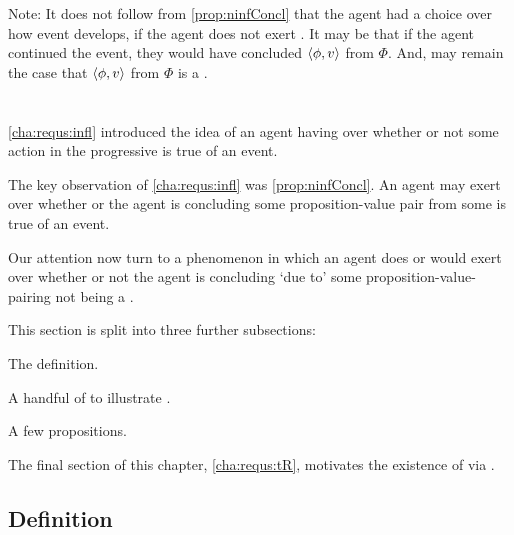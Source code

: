 \begin{note}
  Note:
  It does not follow from \autoref{prop:ninfConcl} that the agent had a choice over how event develops, if the agent does not exert \ninf{}.
  It may be that if the agent continued the event, they would have concluded \(\langle \phi, v \rangle\) from \(\Phi\).
  And, may remain the case that \(\langle \phi, v \rangle\) from \(\Phi\) is a \fc{}.
\end{note}

\section{}
\label{cha:requs:requs}

\begin{note}
  \autoref{cha:requs:infl} introduced the idea of an agent having \ninf{} over whether or not some action in the progressive is true of an event.

  The key observation of \autoref{cha:requs:infl} was \autoref{prop:ninfConcl}.
  An agent may exert \ninf{} over whether or the agent is concluding some proposition-value pair from some \pool{} is true of an event.

  Our attention now turn to a phenomenon in which an agent does or would exert \ninf{} over whether or not the agent is concluding `due to' some proposition-value-\pool{} pairing not being a \fc{}.
\end{note}

\begin{note}
  This section is split into three further subsections:

  \begin{TOCEnum}
  \item

    The definition.
  \item

    A handful of  to illustrate .
  \item

    A few propositions.
  \end{TOCEnum}

  The final section of this chapter, \autoref{cha:requs:tR}, motivates the existence of  via \tC{}.
\end{note}


\subsection{Definition}
\label{cha:requs:def}

